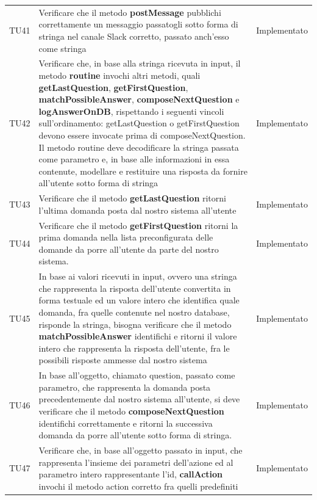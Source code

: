 \documentclass[../PianoDiQualifica_v4.0.0.tex]{subfiles}
\begin{document}
\begin{longtable}[c] { >{\centering\arraybackslash}p{2cm} p{9cm} >{\centering\arraybackslash}p{4cm}}
			\midrule
			\addlinespace[0.3em]
			TU41 & Verificare che il metodo \textbf{postMessage} pubblichi correttamente un messaggio passatogli sotto forma di stringa nel canale Slack corretto, passato anch'esso come stringa & Implementato \\
			\addlinespace[0.3em]
			\midrule
			\addlinespace[0.3em]
			TU42 & Verificare che, in base alla stringa ricevuta in input, il metodo \textbf{routine} invochi altri metodi, quali \textbf{getLastQuestion}, \textbf{getFirstQuestion}, \textbf{matchPossibleAnswer}, \textbf{composeNextQuestion} e \textbf{logAnswerOnDB}, rispettando i seguenti vincoli sull'ordinamento: getLastQuestion o getFirstQuestion devono essere invocate prima di composeNextQuestion. Il metodo routine deve decodificare la stringa passata come parametro e, in base alle informazioni in essa contenute, modellare e restituire una risposta da fornire all'utente sotto forma di stringa & Implementato \\
			\addlinespace[0.3em]
			\midrule
			\addlinespace[0.3em]
			TU43 & Verificare che il metodo \textbf{getLastQuestion} ritorni l'ultima domanda posta dal nostro sistema all'utente & Implementato \\
			\addlinespace[0.3em]
			\midrule
			\addlinespace[0.3em]
			TU44 & Verificare che il metodo \textbf{getFirstQuestion} ritorni la prima domanda nella lista preconfigurata delle domande da porre all'utente da parte del nostro sistema. & Implementato \\
			\addlinespace[0.3em]
			\midrule
			\addlinespace[0.3em]
			TU45 & In base ai valori ricevuti in input, ovvero una stringa che rappresenta la risposta dell'utente convertita in forma testuale ed un valore intero che identifica quale domanda, fra quelle contenute nel nostro database, risponde la stringa, bisogna verificare che il metodo \textbf{matchPossibleAnswer} identifichi e ritorni il valore intero che rappresenta la risposta dell'utente, fra le possibili risposte ammesse dal nostro sistema & Implementato \\
			\addlinespace[0.3em]
			\midrule
			\addlinespace[0.3em]
			TU46 & In base all'oggetto, chiamato question, passato come parametro, che rappresenta la domanda posta precedentemente dal nostro sistema all'utente, si deve verificare che il metodo \textbf{composeNextQuestion} identifichi correttamente e ritorni la successiva domanda da porre all'utente sotto forma di stringa. & Implementato \\
			\addlinespace[0.3em]
			\midrule
			\addlinespace[0.3em]
			TU47 & Verificare che, in base all'oggetto passato in input, che rappresenta l'insieme dei parametri dell'azione ed al parametro intero rappresentante l'id, \textbf{callAction} invochi il metodo action corretto fra quelli predefiniti & Implementato \\

\end{longtable}
\end{document}
